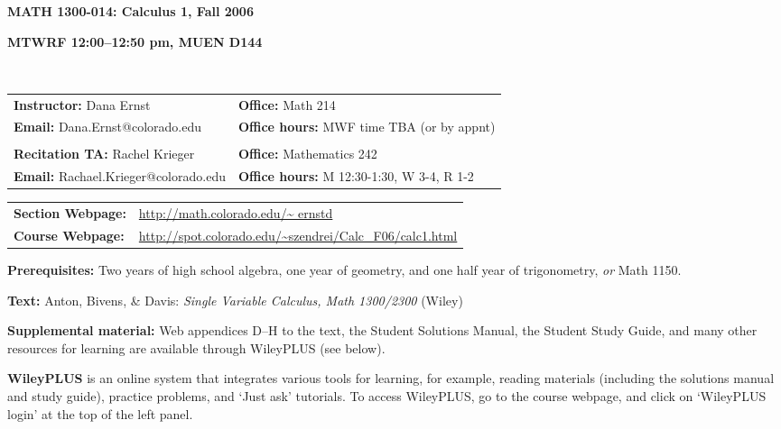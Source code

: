 \documentclass[12pt]{amsart}
\begin{document}
\centerline{\large\bf MATH 1300-014: Calculus 1, Fall 2006} 
\centerline{\bf MTWRF 12:00--12:50 pm, MUEN D144}


\bigskip

\\

\begin{tabular}{ll}
{\bf Instructor:} Dana Ernst & {\bf Office:} Math 214\\
{\bf Email:} Dana.Ernst@colorado.edu & {\bf Office hours:} MWF time TBA (or by appnt)\\
{}\\
{\bf Recitation TA:} Rachel Krieger & {\bf Office:} Mathematics 242\\
{\bf Email:} Rachael.Krieger@colorado.edu & {\bf Office hours:} M 12:30-1:30, W 3-4, R 1-2\\
\end{tabular}

\medskip

\begin{tabular}{ll}
{\bf Section Webpage:} & \url{http://math.colorado.edu/~ ernstd}\\
{\bf Course Webpage:} & \url{http://spot.colorado.edu/~szendrei/Calc_F06/calc1.html}
\end{tabular}

\medskip

\noindent
{\bf Prerequisites:} 
Two years of high school algebra, 
one year of geometry, and 
one half year of trigonometry, 
{\it or} Math 1150.

\medskip

\noindent
{\bf Text:}
Anton, Bivens, \& Davis: 
{\it Single Variable Calculus, Math 1300/2300}
(Wiley)

\medskip

\noindent
{\bf Supplemental material:}
Web appendices D--H to the text, 
the Student Solutions Manual, the Student Study Guide,
and many other resources for learning are available 
through WileyPLUS (see below).

\medskip

\noindent
{\bf WileyPLUS}
is an online system that integrates various tools for learning, 
for example, reading materials 
(including the solutions manual and study guide), 
practice problems, and `Just ask' tutorials.
To access WileyPLUS, go to the course webpage,
and click on `WileyPLUS login' at the top of the left panel.
\end{document}
